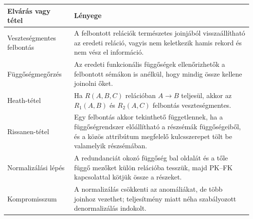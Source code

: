\begin{tabularx}{\textwidth}{L{35mm}X}
\toprule
\textbf{Elvárás vagy tétel} & \textbf{Lényege} \\
\midrule
Veszteségmentes felbontás & A felbontott relációk természetes joinjából visszaállítható az eredeti reláció, vagyis nem keletkezik hamis rekord és nem vész el információ. \\
Függőségmegőrzés & Az eredeti funkcionális függőségek ellenőrizhetők a felbontott sémákon is anélkül, hogy mindig össze kellene joinolni őket. \\
Heath-tétel & Ha \(R(A,B,C)\) relációban \(A \to B\) teljesül, akkor az \(R_1(A,B)\) és \(R_2(A,C)\) felbontás veszteségmentes. \\
Rissanen-tétel & Egy felbontás akkor tekinthető függetlennek, ha a függőségrendszer előállítható a részsémák függőségeiből, és a közös attribútum megfelelő kulcsszerepet tölt be valamelyik részsémában. \\
Normalizálási lépés & A redundanciát okozó függőség bal oldalát és a tőle függő mezőket külön relációba tesszük, majd PK--FK kapcsolattal kötjük össze a részeket. \\
Kompromisszum & A normalizálás csökkenti az anomáliákat, de több joinhoz vezethet; teljesítmény miatt néha szabályozott denormalizálás indokolt. \\
\bottomrule
\end{tabularx}
